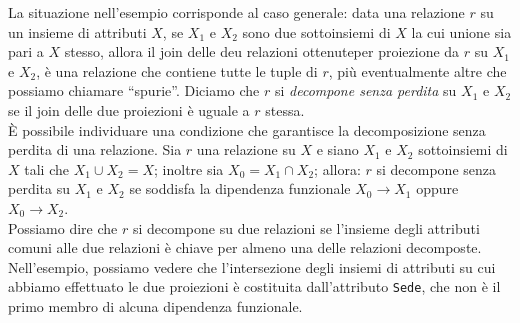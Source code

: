 \documentclass[12pt]{report}
\begin{document}
	La situazione nell'esempio corrisponde al caso generale: data una relazione $r$ su un insieme di attributi $X$, se $X_1$ e $X_2$ sono due sottoinsiemi di $X$ la cui unione sia pari a $X$ stesso, allora il join delle deu relazioni ottenuteper proiezione da $r$ su $X_1$ e $X_2$, è una relazione che contiene tutte le tuple di $r$, più eventualmente altre che possiamo chiamare ``spurie''. Diciamo che $r$ si \textit{decompone senza perdita} su $X_1$ e $X_2$ se il join delle due proiezioni è uguale a $r$ stessa. \\
	È possibile individuare una condizione che garantisce la decomposizione senza perdita di una relazione. Sia $r$ una relazione su $X$ e siano $X_1$ e $X_2$ sottoinsiemi di $X$ tali che $X_1 \cup X_2 = X$; inoltre sia $X_0 = X_1 \cap X_2$; allora: $r$ si decompone senza perdita su $X_1$ e $X_2$ se soddisfa la dipendenza funzionale $X_0 \to X_1$ oppure $X_0 \to X_2$.  \\
	Possiamo dire che $r$ si decompone su due relazioni se l'insieme degli attributi comuni alle due relazioni è chiave per almeno una delle relazioni decomposte. Nell'esempio, possiamo vedere che l'intersezione degli insiemi di attributi su cui abbiamo effettuato le due proiezioni è costituita dall'attributo \texttt{Sede}, che non è il primo membro di alcuna dipendenza funzionale. \\
\end{document}
